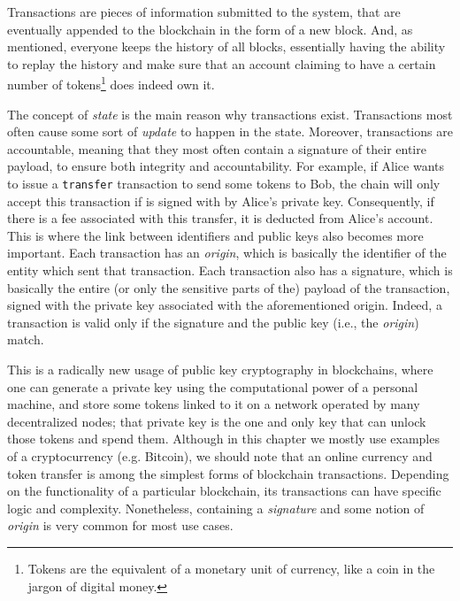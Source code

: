 
Transactions are pieces of information submitted to the system, that are eventually appended to the
blockchain in the form of a new block. And, as mentioned, everyone keeps the history of all blocks,
essentially having the ability to replay the history and make sure that an account claiming to have
a certain number of tokens\footnote{Tokens are the equivalent of a monetary unit of currency, like a
coin in the jargon of digital money.} does indeed own it.

The concept of \textit{state} is the main reason why transactions exist. Transactions most often
cause some sort of \textit{update} to happen in the state. Moreover, transactions are accountable,
meaning that they most often contain a signature of their entire payload, to ensure both integrity
and accountability. For example, if Alice wants to issue a \texttt{transfer} transaction to send
some tokens to Bob, the chain will only accept this transaction if is signed with by Alice's private
key. Consequently, if there is a fee associated with this transfer, it is deducted from Alice's
account. This is where the link between identifiers and public keys also becomes more important.
Each transaction has an \textit{origin}, which is basically the identifier of the entity which sent
that transaction. Each transaction also has a signature, which is basically the entire (or only the
sensitive parts of the) payload of the transaction, signed with the private key associated with the
aforementioned origin. Indeed, a transaction is valid only if the signature and the public key
(i.e., the \textit{origin}) match.

This is a radically new usage of public key cryptography in blockchains, where one can generate a
private key using the computational power of a personal machine, and store some tokens linked to it
on a network operated by many decentralized nodes; that private key is the one and only key that can
unlock those tokens and spend them. Although in this chapter we mostly use examples of a
cryptocurrency (e.g. Bitcoin), we should note that an online currency and token transfer is among
the simplest forms of blockchain transactions. Depending on the functionality of a particular
blockchain, its transactions can have specific logic and complexity. Nonetheless, containing a
\textit{signature} and some notion of \textit{origin} is very common for most use cases.

